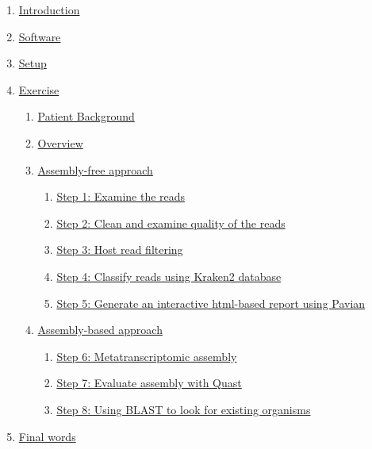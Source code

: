 \documentclass[
]{book}
\providecommand{\tightlist}{%
  \setlength{\itemsep}{0pt}\setlength{\parskip}{0pt}}
\begin{document}
\begin{enumerate}
\def\labelenumi{\arabic{enumi}.}
\tightlist
\item
  \hyperref[intro]{Introduction}
\item
  \hyperref[software]{Software}\\
\item
  \hyperref[setup]{Setup}
\item
  \hyperref[exercise]{Exercise}

  \begin{enumerate}
  \def\labelenumii{\arabic{enumii}.}
  \tightlist
  \item
    \hyperref[exercise-background]{Patient Background}
  \item
    \hyperref[exercise-overview]{Overview}
  \item
    \hyperref[assembly-free]{Assembly-free approach}

    \begin{enumerate}
    \def\labelenumiii{\arabic{enumiii}.}
    \tightlist
    \item
      \hyperref[exercise-examine-reads]{Step 1: Examine the reads}
    \item
      \hyperref[exercise-quality-reads]{Step 2: Clean and examine quality of the reads}
    \item
      \hyperref[exercise-host-filtering]{Step 3: Host read filtering}
    \item
      \hyperref[exercise-classify-kraken]{Step 4: Classify reads using Kraken2 database}
    \item
      \hyperref[exercise-pavian]{Step 5: Generate an interactive html-based report using Pavian}
    \end{enumerate}
  \item
    \hyperref[assembly-based]{Assembly-based approach}

    \begin{enumerate}
    \def\labelenumiii{\arabic{enumiii}.}
    \tightlist
    \item
      \hyperref[exercise-metatranscriptomic-assembly]{Step 6: Metatranscriptomic assembly}
    \item
      \hyperref[exercise-evaluate-assembly]{Step 7: Evaluate assembly with Quast}
    \item
      \hyperref[exercise-blast]{Step 8: Using BLAST to look for existing organisms}
    \end{enumerate}
  \end{enumerate}
\item
  \hyperref[final]{Final words}
\end{enumerate}
\end{document}
